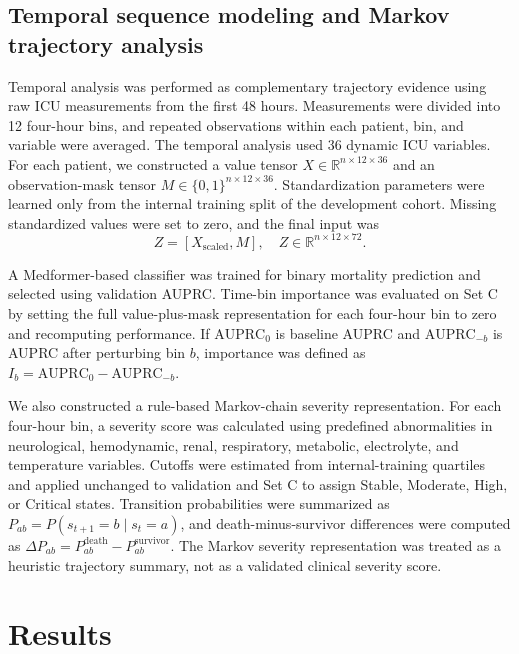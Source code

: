 \documentclass[10pt,twocolumn,letterpaper]{article}
\begin{document}
\subsection{Temporal sequence modeling and Markov trajectory analysis}

Temporal analysis was performed as complementary trajectory evidence using raw ICU measurements from the first 48 hours. Measurements were divided into 12 four-hour bins, and repeated observations within each patient, bin, and variable were averaged. The temporal analysis used 36 dynamic ICU variables. For each patient, we constructed a value tensor $X \in \mathbb{R}^{n \times 12 \times 36}$ and an observation-mask tensor $M \in \{0,1\}^{n \times 12 \times 36}$. Standardization parameters were learned only from the internal training split of the development cohort. Missing standardized values were set to zero, and the final input was
\begin{equation}
Z=[X_{\mathrm{scaled}},M],
\quad
Z \in \mathbb{R}^{n \times 12 \times 72}.
\end{equation}

A Medformer-based classifier was trained for binary mortality prediction and selected using validation AUPRC. Time-bin importance was evaluated on Set C by setting the full value-plus-mask representation for each four-hour bin to zero and recomputing performance. If $\mathrm{AUPRC}_{0}$ is baseline AUPRC and $\mathrm{AUPRC}_{-b}$ is AUPRC after perturbing bin $b$, importance was defined as $I_b=\mathrm{AUPRC}_{0}-\mathrm{AUPRC}_{-b}$.

We also constructed a rule-based Markov-chain severity representation. For each four-hour bin, a severity score was calculated using predefined abnormalities in neurological, hemodynamic, renal, respiratory, metabolic, electrolyte, and temperature variables. Cutoffs were estimated from internal-training quartiles and applied unchanged to validation and Set C to assign Stable, Moderate, High, or Critical states. Transition probabilities were summarized as $P_{ab}=P(s_{t+1}=b \mid s_t=a)$, and death-minus-survivor differences were computed as $\Delta P_{ab}=P_{ab}^{\mathrm{death}}-P_{ab}^{\mathrm{survivor}}$. The Markov severity representation was treated as a heuristic trajectory summary, not as a validated clinical severity score.


\section{Results}
\end{document}
